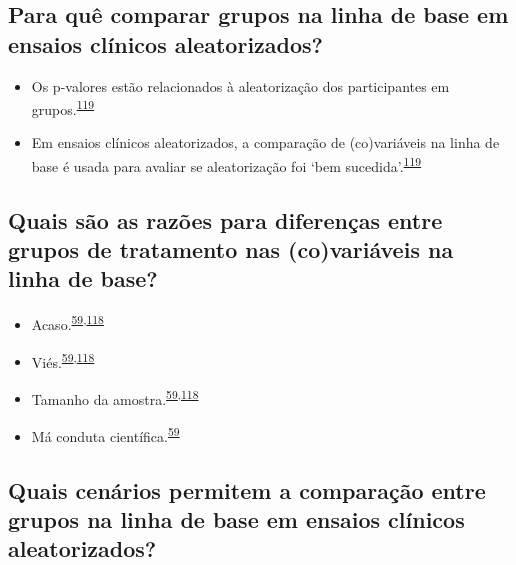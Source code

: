 \documentclass[
]{book}
\begin{document}
\hypertarget{para-quuxea-comparar-grupos-na-linha-de-base-em-ensaios-cluxednicos-aleatorizados}{%
\subsection{Para quê comparar grupos na linha de base em ensaios clínicos aleatorizados?}\label{para-quuxea-comparar-grupos-na-linha-de-base-em-ensaios-cluxednicos-aleatorizados}}

\begin{itemize}
\item
  Os p-valores estão relacionados à aleatorização dos participantes em grupos.\textsuperscript{\protect\hyperlink{ref-Bolzern2019}{119}}
\item
  Em ensaios clínicos aleatorizados, a comparação de (co)variáveis na linha de base é usada para avaliar se aleatorização foi `bem sucedida'.\textsuperscript{\protect\hyperlink{ref-Bolzern2019}{119}}
\end{itemize}

\hypertarget{quais-suxe3o-as-razuxf5es-para-diferenuxe7as-entre-grupos-de-tratamento-nas-covariuxe1veis-na-linha-de-base}{%
\subsection{Quais são as razões para diferenças entre grupos de tratamento nas (co)variáveis na linha de base?}\label{quais-suxe3o-as-razuxf5es-para-diferenuxe7as-entre-grupos-de-tratamento-nas-covariuxe1veis-na-linha-de-base}}

\begin{itemize}
\item
  Acaso.\textsuperscript{\protect\hyperlink{ref-chen2020}{59},\protect\hyperlink{ref-Stang2018}{118}}
\item
  Viés.\textsuperscript{\protect\hyperlink{ref-chen2020}{59},\protect\hyperlink{ref-Stang2018}{118}}
\item
  Tamanho da amostra.\textsuperscript{\protect\hyperlink{ref-chen2020}{59},\protect\hyperlink{ref-Stang2018}{118}}
\item
  Má conduta científica.\textsuperscript{\protect\hyperlink{ref-chen2020}{59}}
\end{itemize}

\hypertarget{quais-cenuxe1rios-permitem-a-comparauxe7uxe3o-entre-grupos-na-linha-de-base-em-ensaios-cluxednicos-aleatorizados}{%
\subsection{Quais cenários permitem a comparação entre grupos na linha de base em ensaios clínicos aleatorizados?}\label{quais-cenuxe1rios-permitem-a-comparauxe7uxe3o-entre-grupos-na-linha-de-base-em-ensaios-cluxednicos-aleatorizados}}
\end{document}
